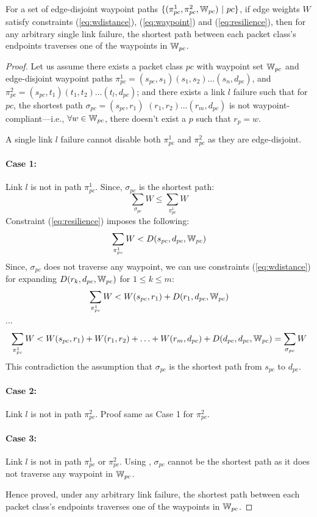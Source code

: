 \begin{theorem}[Soundness]
	For a set of edge-disjoint waypoint paths $\{(\pi^1_{pc}, \pi^2_{pc}, \mathbb{W}_{pc}) ~|~ pc\}$, 
	if edge weights $W$ satisfy constraints (\ref{eq:wdistance}), (\ref{eq:waypoint}) and
	(\ref{eq:resilience}), 
	then for any arbitrary single link failure, 
	the shortest path between each packet class's 
	endpoints traverses one of the waypoints in $\mathbb{W}_{pc}$.
\end{theorem}
\begin{proof}
	Let us assume there exists a packet class $pc$ with waypoint set $\mathbb{W}_{pc}$ 
	and edge-disjoint waypoint paths $\pi^1_{pc} = (s_{pc}, s_1)(s_1, s_2)\ldots (s_n, d_{pc})$, 
	and $\pi^2_{pc} = (s_{pc}, t_1)(t_1, t_2)\ldots (t_l, d_{pc})$; and there exists 
	a link $l$ failure 
	such that for $pc$, the 
	shortest path $\sigma_{pc}=(s_{pc}, r_1)$ $(r_1, r_2)\ldots (r_m, d_{pc})$ 
	is not waypoint-compliant---i.e.,  
	$\forall w \in \mathbb{W}_{pc}$, there doesn't exist a $p$ such that $r_p = w$. 
	
	A single link $l$ failure cannot disable both $\pi_{pc}^1$ and $\pi_{pc}^2$ as they are 
	edge-disjoint. 
	\paragraph{Case 1:} Link $l$ is not in path $\pi_{pc}^1$. Since, $\sigma_{pc}$ is 
	the shortest path: 
	\[
	\sum_{\sigma_{pc}}W \leq \sum_{\pi_{pc}^1}W
	\]
	Constraint (\ref{eq:resilience}) imposes the following: 
	\[
	\sum_{\pi_{pc}^1}W < D(s_{pc}, d_{pc}, \mathbb{W}_{pc}) 
	\]
	Since, $\sigma_{pc}$ does not traverse any waypoint, we can use 
	constraints (\ref{eq:wdistance}) for expanding $D(r_k, d_{pc}, \mathbb{W}_{pc})$ 
	for $1 \leq k \leq m$: 
	\[
	\sum_{\pi_{pc}^1}W < W(s_{pc}, r_1) + D(r_1, d_{pc}, \mathbb{W}_{pc}) 
	\]
	\begin{center}
	$\ldots$
	\end{center}
	\[
	\sum_{\pi_{pc}^1}W < W(s_{pc}, r_1) + W(r_1, r_2) + \ldots + W(r_m, d_{pc}) + D(d_{pc}, d_{pc}, \mathbb{W}_{pc}) = \sum_{\sigma_{pc}}W
	\]
	This contradiction the assumption that $\sigma_{pc}$ is the shortest path from $s_{pc}$ to $d_{pc}$.

	\paragraph{Case 2:} Link $l$ is not in path $\pi_{pc}^2$. Proof same as Case 1 for $\pi_{pc}^2$. 
	\paragraph{Case 3:} Link $l$ is not in path $\pi_{pc}^1$ or $\pi_{pc}^2$. Using , 
	$\sigma_{pc}$ cannot be the shortest path as it does not traverse any waypoint in $\mathbb{W}_{pc}$. 
	
	Hence proved, under any arbitrary link failure, the shortest path between each packet class's 
	endpoints traverses one of the waypoints in $\mathbb{W}_{pc}$.
\end{proof}

